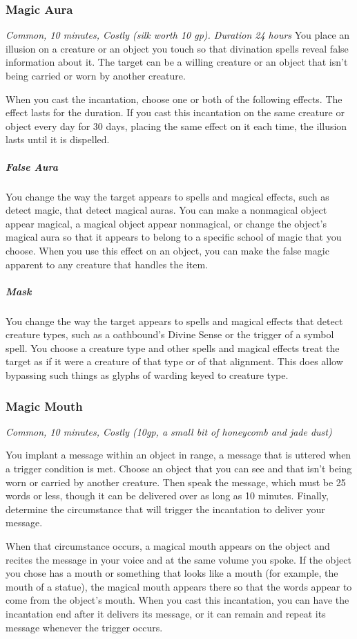 \subsubsection{Magic Aura}
\textit{Common, 10 minutes, Costly (silk worth 10 gp). Duration 24 hours}
You place an illusion on a creature or an object you touch so that divination spells reveal false information about it. The target can be a willing creature or an object that isn't being carried or worn by another creature.

When you cast the incantation, choose one or both of the following effects. The effect lasts for the duration. If you cast this incantation on the same creature or object every day for 30 days, placing the same effect on it each time, the illusion lasts until it is dispelled.

\subparagraph*{False Aura} You change the way the target appears to spells and magical effects, such as detect magic, that detect magical auras. You can make a nonmagical object appear magical, a magical object appear nonmagical, or change the object's magical aura so that it appears to belong to a specific school of magic that you choose. When you use this effect on an object, you can make the false magic apparent to any creature that handles the item.

\subparagraph*{Mask} You change the way the target appears to spells and magical effects that detect creature types, such as a oathbound's Divine Sense or the trigger of a symbol spell. You choose a creature type and other spells and magical effects treat the target as if it were a creature of that type or of that alignment. This does allow bypassing such things as glyphs of warding keyed to creature type.

\subsubsection{Magic Mouth}
\textit{Common, 10 minutes, Costly (10gp, a small bit of honeycomb and jade dust)}

You implant a message within an object in range, a message that is uttered when a trigger condition is met. Choose an object that you can see and that isn't being worn or carried by another creature. Then speak the message, which must be 25 words or less, though it can be delivered over as long as 10 minutes. Finally, determine the circumstance that will trigger the incantation to deliver your message.

When that circumstance occurs, a magical mouth appears on the object and recites the message in your voice and at the same volume you spoke. If the object you chose has a mouth or something that looks like a mouth (for example, the mouth of a statue), the magical mouth appears there so that the words appear to come from the object's mouth. When you cast this incantation, you can have the incantation end after it delivers its message, or it can remain and repeat its message whenever the trigger occurs.

